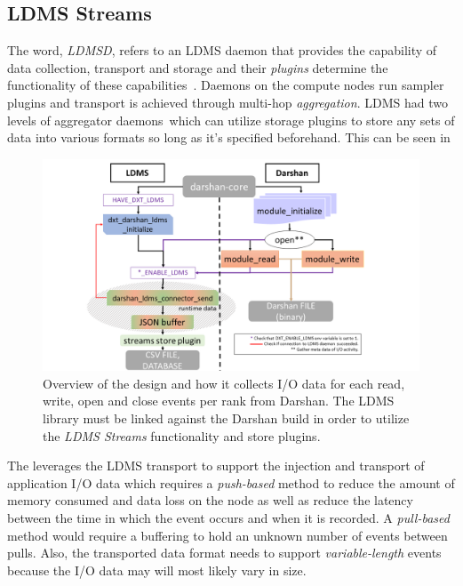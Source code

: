 \subsection{LDMS Streams}
The word, \emph{LDMSD}, refers to an LDMS daemon that provides the capability of data collection, transport and storage and their \emph{plugins} determine the functionality of these capabilities~\cite{ldmsgithubwiki}. Daemons on the compute nodes run sampler plugins and transport is achieved through multi-hop \emph{aggregation}. LDMS had two levels of aggregator daemons~\cite{ldmsgithubwiki}which can utilize storage plugins to store any sets of data into various formats so long as it's specified beforehand. This can be seen in 

\begin{figure}
	\centering
	\includegraphics[trim={3.5cm 0 0 0},clip,
	width=1.15\linewidth]{figs/darshan-connector.PNG}
	\caption{Overview of the \connector design and how it collects I/O data for each read, write, open and close events per rank from Darshan. The LDMS library must be linked against the Darshan build in order to utilize the \emph{LDMS Streams} functionality and store plugins.}
	\label{f:Darshan Connector}
\end{figure}

The \Darshan leverages the LDMS transport to support the injection and transport of application I/O data which requires a \emph{push-based} method to reduce the amount of memory consumed and data loss on the node as well as reduce the latency between the time in which the event occurs and when it is recorded. A \emph{pull-based} method would require a buffering to hold an unknown number of events between pulls. Also, the transported data format needs to support  \emph{variable-length} events because the I/O data may will most likely vary in size. 


